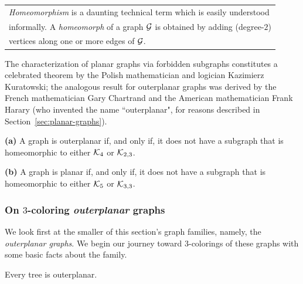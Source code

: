 \smallskip

\begin{tabular}{l}
{\it Homeomorphism} is a daunting technical term which is easily understood \\
informally.  A {\it homeomorph} of a graph $\mbox{$\cal G$}$ is obtained by adding (degree-$2$) \\
vertices along one or more edges of $\mbox{$\cal G$}$.
\end{tabular}

\smallskip


\noindent
The characterization of planar graphs via forbidden subgraphs constitutes a celebrated theorem by the Polish mathematician and logician Kazimierz Kuratowski; the analogous result for outerplanar graphs was derived by the French mathematician Gary Chartrand and the American mathematician Frank Harary (who invented the name ``outerplanar", for reasons described in Section~\ref{sec:planar-graphs}).

 
 
\begin{theorem}
\label{thm:planar+outerplanar-exclusion}
{\bf (a)} {\rm \cite{ChartrandB67}}
A graph is outerplanar if, and only if, it does not have a subgraph that is homeomorphic to either $\mbox{$\cal K$}_4$ or $\mbox{$\cal K$}_{2,3}$.

\smallskip

\noindent
{\bf (b)} {\rm \cite{Kuratowski30}}
A graph is planar if, and only if, it does not have a subgraph that is homeomorphic to either $\mbox{$\cal K$}_5$ or $\mbox{$\cal K$}_{3,3}$.
\end{theorem}


\subsubsection{On $3$-coloring {\em outerplanar} graphs}


We look first at the smaller of this section's graph families, namely, the {\it outerplanar graphs}. 
We begin our journey toward $3$-colorings of these graphs with some basic facts about the family.

\begin{prop}
Every tree is outerplanar.
\end{prop}

